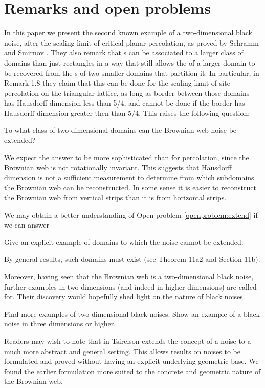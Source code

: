 {
\section{Remarks and open problems}

\label{sec:open-problems}

In this paper we present the second known example of a two-dimensional
black noise, after the scaling limit of critical planar percolation,
as proved by Schramm and Smirnov \cite{schramm-smirnov}.  They also remark
that \sigfield{}s can be associated to a larger class of domains than
just rectangles in a way that still allows the \sigfield{} of a larger
domain to be recovered from the \sigfield{}s of two smaller domains
that partition it.
In particular, in Remark 1.8 they claim that this can be done for the
scaling limit of site percolation on the triangular lattice, as long
as border between those domains has Hausdorff dimension less
than 5/4, and cannot be done if the border has Hausdorff dimension
greater then than 5/4. This raises the following question:

\begin{openproblem}
  \label{openproblem:extend}
  To what class of two-dimensional domains can the Brownian web noise be extended?
\end{openproblem}

We expect the answer to be more sophisticated than for percolation,
since the Brownian web is not rotationally invariant.  
This suggests that Hausdorff dimension is not a sufficient measurement
to determine from which subdomains the Brownian web can be
reconstructed.  In some sense it is easier to reconstruct the Brownian
web from vertical strips than it is from horizontal strips.

We may obtain a better understanding of Open problem
\ref{openproblem:extend} if we can answer

\begin{openproblem}
  Give an explicit example of domains to which the noise
  cannot be extended.
\end{openproblem}

By general results, such domains must exist (see
\cite{tsirelson-nonclassical-stochastic-flows} Theorem 11a2 and
Section 11b).

Moreover, having seen that the Brownian web is a two-dimensional black
noise, further examples in two dimensions (and indeed in higher
dimensions) are called for.  Their
discovery would hopefully shed light on the nature of black noises.

\begin{openproblem}
  Find more examples of two-dimensional black noises.  Show an example
  of a black noise in three dimensions or higher.
\end{openproblem}

Readers may wish to note that in
\cite{tsirelson-noise-as-a-boolean-algebra} Tsirelson extends the
concept of a noise to a much more abstract and general setting.  This
allows results on noises to be formulated and proved without having an
explicit underlying geometric base.  We found the earlier formulation
more suited to the concrete and geometric nature of the Brownian web.
}
